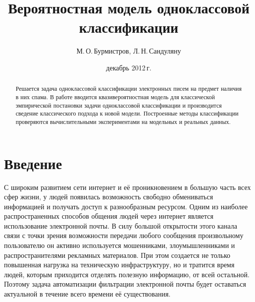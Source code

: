 ﻿\documentclass[12pt,a4paper]{amsart}
\begin{document}
	\title{Вероятностная модель одноклассовой классификации}
	\author{М.\,О.\,Бурмистров, Л.\,Н.\,Сандуляну}
	\address{Московский физико-технический институт, ФУПМ, каф. <<Интеллектуальные системы>>}
	\date{декабрь 2012\,г.}

	\begin{abstract}
	Решается задача одноклассовой классификации электронных писем на предмет наличия в них спама. 
	В работе вводится квазивероятностная модель для классической эмпирической постановки задачи одноклассовой классификации и 
	производится сведение классического подхода к новой модели.
	Построенные методы классификации проверяются вычислительными экспериментами на модельных и реальных данных.
	\end{abstract}

\maketitle
\section{Введение} 							
	С широким развитием сети интернет и её проникновением в большую часть всех сфер жизни, у людей появилась возможность свободно обмениваться информацией и получать доступ к разнообразным ресурсом. 
	Одним из наиболее распространенных способов общения людей через интернет является использование электронной почты. 
	В силу большой открытости этого канала связи с точки зрения возможности передачи любого сообщения произвольному пользователю он активно используется мошенниками, злоумышленниками и распространителями рекламных материалов. При этом создается не только повышенная нагрузка на техническую инфраструктуру, но и тратится время людей, которым приходится отделять полезную информацию, от всей остальной. 
	Поэтому задача автоматизации фильтрации электронной почты будет оставаться актуальной в течение всего времени её существования.
\end{document}
